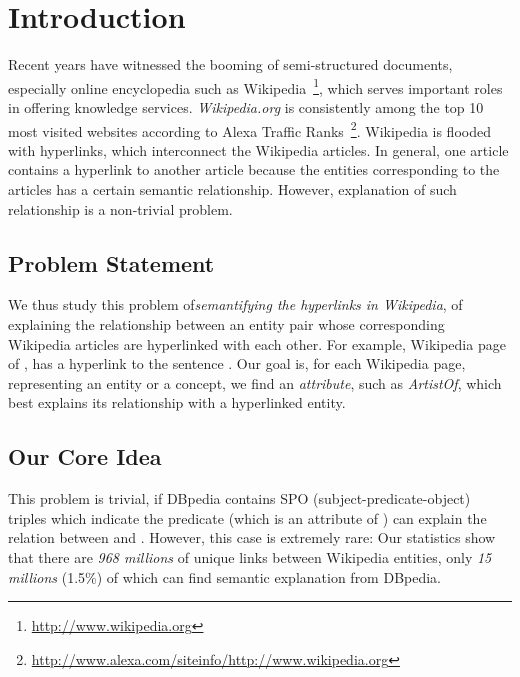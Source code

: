 \section{Introduction}

Recent years have witnessed the booming of semi-structured documents, especially online encyclopedia such as  Wikipedia~\footnote{\small\url{http://www.wikipedia.org}}, which serves important roles in offering knowledge services.
{\it Wikipedia.org} is consistently among the top 10 most visited websites according to Alexa Traffic Ranks~\footnote{\small\url{http://www.alexa.com/siteinfo/http://www.wikipedia.org}}.
Wikipedia is flooded with hyperlinks, which interconnect the Wikipedia articles.
In general, one article contains a hyperlink to another article because the entities corresponding to the articles has a certain semantic relationship.
However, explanation of such relationship is a non-trivial problem.

\subsection{Problem Statement}
We thus study this problem of{\it semantifying the hyperlinks in Wikipedia}, of 
explaining the relationship between an entity pair whose corresponding Wikipedia articles are hyperlinked with each other.
For example, Wikipedia page of , has a hyperlink to  the sentence .
Our goal is, for each Wikipedia page, representing an entity or a concept,
we find an \emph{attribute}, such as \emph{ArtistOf}, which best explains its relationship with a hyperlinked entity.


\subsection{Our Core Idea}

This problem is trivial, if DBpedia contains 
SPO (subject-predicate-object) triples  which indicate the predicate  (which is an attribute of ) can explain the relation between  and . However, this case is extremely rare:
Our statistics show that there are \emph{968 millions} of unique links between Wikipedia entities, only \emph{15 millions} (1.5\%) of which can find semantic explanation from DBpedia.

